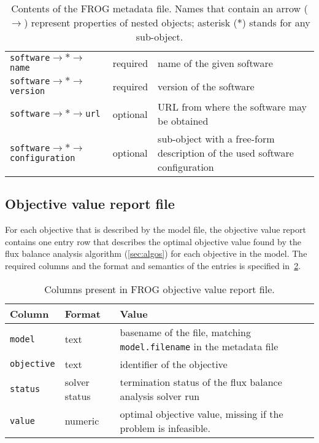 \begin{table}
\begin{tabular}{llp{30em}}
 \\\addlinespace
\verb|software|$\to\ast\to$\verb|name|
 & required
 & name of the given software
 \\
\verb|software|$\to\ast\to$\verb|version|
 & required
 & version of the software
 \\
\verb|software|$\to\ast\to$\verb|url|
 & optional
 & URL from where the software may be obtained
 \\
\verb|software|$\to\ast\to$\verb|configuration|
 & optional
 & sub-object with a free-form description of the used software configuration
 \\
\bottomrule
\end{tabular}
\caption[Contents of the FROG metadata file.]{Contents of the FROG metadata file. Names that contain an arrow ($\to$) represent properties of nested objects; asterisk ($\ast$) stands for any sub-object.}
\label{tab:metadata}
\end{table}

\subsection{Objective value report file}
\label{sec:obj}

For each objective that is described by the model file, the objective value report contains one entry row that describes the optimal objective value found by the flux balance analysis algorithm (\cref{sec:algos}) for each objective in the model. The required columns and the format and semantics of the entries is specified in~\cref{tab:objfields}.

\begin{table}\tablefont
\begin{tabular}{llp{30em}}
\toprule
Column & Format & Value \\
\midrule
\verb|model|
 & text
 & basename of the file, matching \verb|model.filename| in the metadata file
 \\
\verb|objective|
 & text
 & identifier of the objective
 \\
\verb|status|
 & solver status
 & termination status of the flux balance analysis solver run
 \\
\verb|value|
 & numeric
 & optimal objective value, missing if the problem is infeasible.
 \\
\bottomrule
\end{tabular}
\caption{Columns present in FROG objective value report file.}
\label{tab:objfields}
\end{table}

